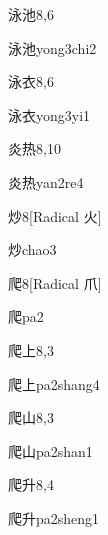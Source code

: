 \begin{entry}{泳池}{8,6}
  \begin{phonetics}{泳池}{yong3chi2}
  \end{phonetics}
\end{entry}

\begin{entry}{泳衣}{8,6}
  \begin{phonetics}{泳衣}{yong3yi1}
  \end{phonetics}
\end{entry}

\begin{entry}{炎热}{8,10}
  \begin{phonetics}{炎热}{yan2re4}
  \end{phonetics}
\end{entry}

\begin{entry}{炒}{8}[Radical ⽕]
  \begin{phonetics}{炒}{chao3}
  \end{phonetics}
\end{entry}

\begin{entry}{爬}{8}[Radical 爪]
  \begin{phonetics}{爬}{pa2}
  \end{phonetics}
\end{entry}

\begin{entry}{爬上}{8,3}
  \begin{phonetics}{爬上}{pa2shang4}
  \end{phonetics}
\end{entry}

\begin{entry}{爬山}{8,3}
  \begin{phonetics}{爬山}{pa2shan1}
  \end{phonetics}
\end{entry}

\begin{entry}{爬升}{8,4}
  \begin{phonetics}{爬升}{pa2sheng1}
  \end{phonetics}
\end{entry}

